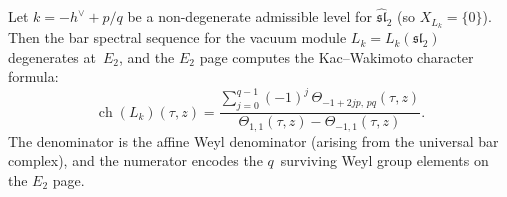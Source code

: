 \begin{theorem}
\label{thm:kw-bar-spectral}
Let $k = -h^\vee + p/q$ be a non-degenerate admissible level for
$\widehat{\mathfrak{sl}}_2$ (so $X_{L_k} = \{0\}$).  Then the
bar spectral sequence for the vacuum module
$L_k = L_k(\mathfrak{sl}_2)$ degenerates at~$E_2$, and the
$E_2$ page computes the Kac--Wakimoto character formula:
\begin{equation}\label{eq:kw-bar-derivation}
\operatorname{ch}(L_k)(\tau,z)
= \frac{\sum_{j=0}^{q-1} (-1)^j\, \Theta_{-1+2jp,\, pq}(\tau,z)}
       {\Theta_{1,1}(\tau,z) - \Theta_{-1,1}(\tau,z)}.
\end{equation}
The denominator is the affine Weyl denominator (arising from
the universal bar complex), and the numerator encodes the
$q$~surviving Weyl group elements on the $E_2$ page.
\end{theorem}

